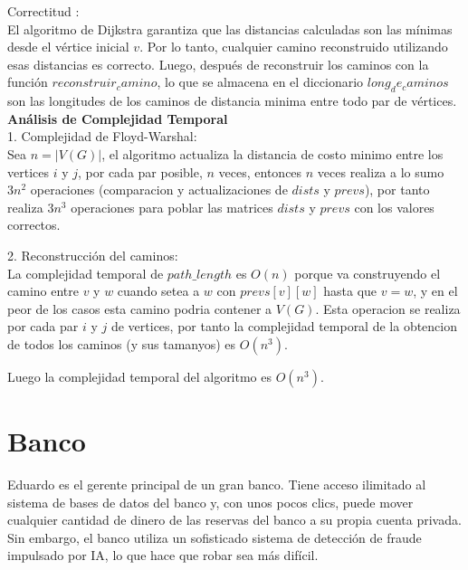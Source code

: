\documentclass[
10pt, %
a4paper, %
oneside, %
headinclude,footinclude, %
BCOR5mm, %
]{scrartcl}
\begin{document}
Correctitud : \\
El algoritmo de Dijkstra garantiza que las distancias calculadas son las mínimas desde el vértice inicial $v$. Por lo tanto, 
cualquier camino reconstruido utilizando esas distancias es correcto. Luego, después de reconstruir los caminos con la función $reconstruir_camino$, 
lo que se almacena en el diccionario $long_de_caminos$ son las longitudes de los caminos de distancia minima entre todo par de 
vértices.\\


\textbf{Análisis de Complejidad Temporal}\\

1. Complejidad de Floyd-Warshal:\\

Sea $n = |V(G)|$, el algoritmo actualiza la distancia de costo minimo entre los vertices $i$ y $j$, por cada par posible, $n$ veces, entonces $n$ veces realiza a lo sumo $3n^2$ operaciones (comparacion y actualizaciones de $dists$ y $prevs$),
por tanto realiza $3n^3$ operaciones para poblar las matrices $dists$ y $prevs$ con los valores correctos.

2. Reconstrucción del caminos:\\

La complejidad temporal de $path\_length$ es $O (n)$ porque va construyendo el camino entre $v$ y $w$ cuando setea a $w$ con $prevs[v][w]$ hasta que $v = w$, y en el peor de los casos
esta camino podria contener a $V(G)$. Esta operacion se realiza por cada par $i$ y $j$ de vertices, por tanto la complejidad temporal de la obtencion de todos los caminos (y sus tamanyos) es
$O (n^3)$.

Luego la complejidad temporal del algoritmo es $O (n^3)$.



 

\section{Banco}

Eduardo es el gerente principal de un gran banco. Tiene acceso ilimitado al sistema de bases de datos del banco y, con unos pocos clics, puede mover cualquier cantidad de dinero de las reservas del banco a su propia cuenta privada. Sin embargo, el banco utiliza un sofisticado sistema de detección de fraude impulsado por IA, lo que hace que robar sea más difícil. \\
\end{document}
